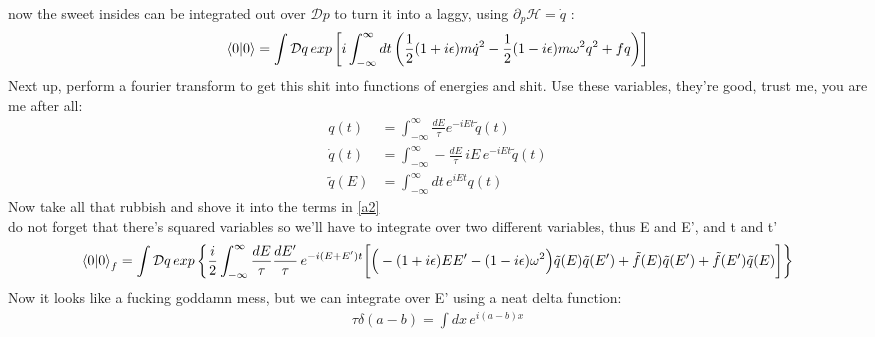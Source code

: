 \documentclass{article}
\begin{document}
now the sweet insides can be integrated out over $\mathcal{D}p$ to turn it into a laggy, using $\partial_{p}\mathcal{H} = \dot{q}$ :
\begin{align}
	\braket{0}{0}=\int \mathcal{D}q \,exp \left[ i \int_{-\infty}^{\infty}dt \left( \frac{1}{2}(1+i\epsilon)m\dot{q}^2 - \frac{1}{2}(1-i\epsilon)m\omega^2q^2 + fq \right) \right] \label{a2}
\end{align}
Next up, perform a fourier transform to get this shit into functions of energies and shit. Use these variables, they're good, trust me, you are me after all:
\begin{align}
	q(t)&=\int_{-\infty}^{\infty} \frac{dE}{\tau} e^{-iEt} \tilde{q}(t) \\
	\dot{q}(t)&=\int_{-\infty}^{\infty} -\frac{dE}{\tau}\,iE\,e^{-iEt} \tilde{q}(t) \\
\tilde{q}(E)&=\int_{-\infty}^{\infty}dt\,e^{iEt}q(t)
\end{align}
Now take all that rubbish and shove it into the terms in \ref{a2} \\ do not forget that there's squared variables so we'll have to integrate over two different variables, thus E and E', and t and t'
\begin{align}
	\braket{0}{0}_f = \int \mathcal{D}q\, exp \left\{ \frac{i}{2} \int_{-\infty}^{\infty} \frac{dE}{\tau} \frac{dE'}{\tau}\, e^{-i(E+E')t} \bigg[ \Big( -(1+i\epsilon)EE' - (1-i\epsilon)\omega^2 \Big) \tilde{q}(E) \tilde{q}(E') + \tilde{f}(E) \tilde{q}(E') + \tilde{f}(E') \tilde{q}(E) \bigg] \right\}
\end{align}
Now it looks like a fucking goddamn mess, but we can integrate over E' using a neat delta function:
\begin{align}
	\tau \delta(a-b)= \int dx\,e^{i(a-b)x}
\end{align}
\end{document}
